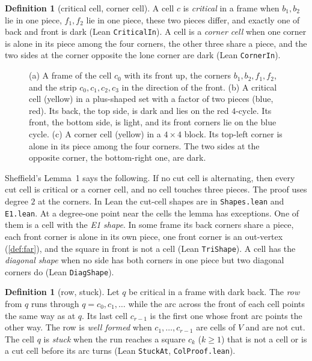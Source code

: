 \documentclass[11pt]{article}
\theoremstyle{plain}
\theoremstyle{definition}
\newtheorem{definition}[theorem]{Definition}
\theoremstyle{remark}
\newcommand{\lean}[1]{\texttt{#1}}
\begin{document}
\begin{definition}[critical cell, corner cell]
\label{def:critical}
A cell $c$ is \emph{critical} in a frame when $b_1,b_2$ lie in one piece, $f_1,f_2$ lie in one
piece, these two pieces differ, and exactly one of back and front is dark (Lean
\lean{CriticalIn}).
A cell is a \emph{corner cell} when one corner is alone in its piece among the four corners, the
other three share a piece, and the two sides at the corner opposite the lone corner are dark
(Lean \lean{CornerIn}).
\end{definition}

\begin{figure}[t]
\centering

\caption{(a) A frame of the cell $c_0$ with its front up, the corners $b_1,b_2,f_1,f_2$, and the strip
$c_0,c_1,c_2,c_3$ in the direction of the front.
(b) A critical cell (yellow) in a plus-shaped set with a factor of two pieces (blue, red).
Its back, the top side, is dark and lies on the red $4$-cycle.
Its front, the bottom side, is light, and its front corners lie on the blue cycle.
(c) A corner cell (yellow) in a $4\times4$ block.
Its top-left corner is alone in its piece among the four corners.
The two sides at the opposite corner, the bottom-right one, are dark.}
\label{fig:frame}
\end{figure}

Sheffield's Lemma~1 says the following.
If no cut cell is alternating, then every cut cell is critical or a corner cell, and no cell
touches three pieces.
The proof uses degree $2$ at the corners.
In Lean the cut-cell shapes are in \lean{Shapes.lean} and \lean{E1.lean}.
At a degree-one point near the cells the lemma has exceptions.
One of them is a cell with the \emph{E1 shape}.
In some frame its back corners share a piece, each front corner is alone in its own piece, one front
corner is an out-vertex (\cref{def:far}), and the square in front is not a cell (Lean
\lean{TriShape}).
A cell has the \emph{diagonal shape} when no side has both corners in one piece but two diagonal
corners do (Lean \lean{DiagShape}).

\begin{definition}[row, stuck]
\label{def:row}
Let $q$ be critical in a frame with dark back.
The \emph{row} from $q$ runs through $q=c_0,c_1,\dots$ while the arc across the front of each cell
points the same way as at $q$.
Its last cell $c_{r-1}$ is the first one whose front arc points the other way.
The row is \emph{well formed} when $c_1,\dots,c_{r-1}$ are cells of $V$ and are not cut.
The cell $q$ is \emph{stuck} when the run reaches a square $c_k$ ($k\ge1$) that is not a cell or is
a cut cell before its arc turns (Lean \lean{StuckAt}, \lean{ColProof.lean}).
\end{definition}
\end{document}
